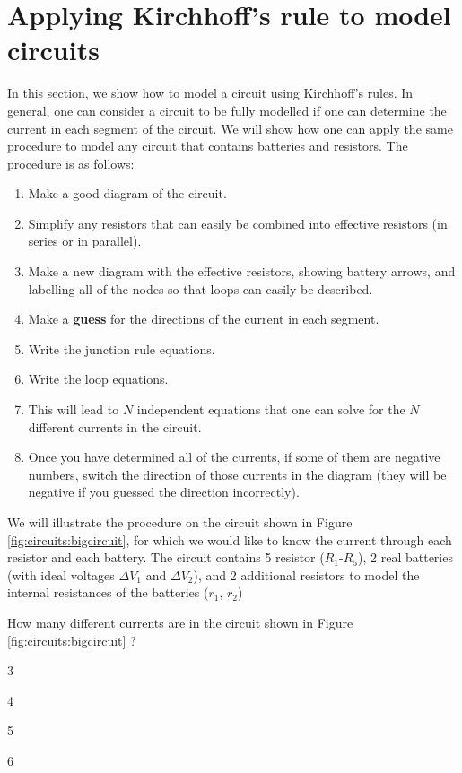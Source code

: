 \section{Applying Kirchhoff's rule to model circuits}
In this section, we show how to model a circuit using Kirchhoff's rules. In general, one can consider a circuit to be fully modelled if one can determine the current in each segment of the circuit. We will show how one can apply the same procedure to model any circuit that contains batteries and resistors. The procedure is as follows:
\begin{enumerate}
\item Make a good diagram of the circuit.
\item Simplify any resistors that can easily be combined into effective resistors (in series or in parallel).
\item Make a new diagram with the effective resistors, showing battery arrows, and labelling all of the nodes so that loops can easily be described.
\item Make a \textbf{guess} for the directions of the current in each segment.
\item Write the junction rule equations.
\item Write the loop equations.
\item This will lead to $N$ independent equations that one can solve for the $N$ different currents in the circuit.
\item Once you have determined all of the currents, if some of them are negative numbers, switch the direction of those currents in the diagram (they will be negative if you guessed the direction incorrectly).
\end{enumerate}

We will illustrate the procedure on the circuit shown in Figure \ref{fig:circuits:bigcircuit}, for which we would like to know the current through each resistor and each battery. The circuit contains 5 resistor ($R_1$-$R_5$), 2 real batteries (with ideal voltages $\Delta V_1$ and $\Delta V_2$), and 2 additional resistors to model the internal resistances of the batteries ($r_1$, $r_2$)


\begin{checkpoint}{}
\begin{MCquestion}{How many different currents are in the circuit shown in Figure \ref{fig:circuits:bigcircuit} ?}
\item 3
\item 4
\item 5 \correct
\item 6
\end{MCquestion}
\end{checkpoint}

